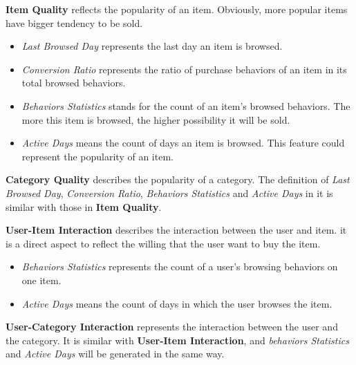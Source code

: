 \documentclass{llncs}
\begin{document}
\textbf{Item Quality} reflects the popularity of an item.
Obviously, more popular items have bigger tendency to be sold.
\begin{itemize}
	\item \emph{Last Browsed Day} represents the last day an item is browsed.
	
	\item \emph{Conversion Ratio} represents the ratio of purchase behaviors of an item
	in its total browsed behaviors.
	
	\item \emph{Behaviors Statistics} stands for the count of an item's browsed behaviors.
	The more this item is browsed, the higher possibility it will be sold.
	
	\item \emph{Active Days} means the count of days an item is browsed.
	This feature could represent the popularity of an item.
\end{itemize}

\textbf{Category Quality} describes the popularity of a category.
The definition of \emph{Last Browsed Day}, \emph{Conversion Ratio},
\emph{Behaviors Statistics} and \emph{Active Days} in it is similar
with those in \textbf{Item Quality}.

\textbf{User-Item Interaction} describes the interaction between the user and item.
it is a direct aspect to reflect the willing that the user want to buy the item.
\begin{itemize}
	\item \emph{Behaviors Statistics} represents the count of a user's browsing behaviors on one item.
	
	\item \emph{Active Days} means the count of days in which the user browses the item.
\end{itemize}

\textbf{User-Category Interaction} represents the interaction between the user and the category.
It is similar with \textbf{User-Item Interaction},
and \emph{behaviors Statistics} and \emph{Active Days} will be generated in the same way.
\end{document}
